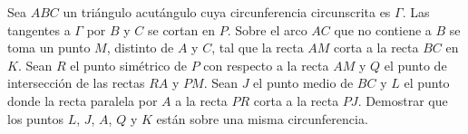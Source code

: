 Sea $ABC$ un triángulo acutángulo cuya circunferencia circunscrita es $\Gamma$. Las tangentes a $\Gamma$ por $B$ y $C$ se cortan en $P$. Sobre el arco $AC$ que no contiene a $B$ se toma un punto $M$, distinto de $A$ y $C$, tal que la recta $AM$ corta a la recta $BC$ en $K$. Sean $R$ el punto simétrico de $P$ con respecto a la recta $AM$ y $Q$ el punto de intersección de las rectas $RA$ y $PM$. Sean $J$ el punto medio de $BC$ y $L$ el punto donde la recta paralela por $A$ a la recta $PR$ corta a la recta $PJ$. Demostrar que los puntos $L$, $J$, $A$, $Q$ y $K$ están sobre una misma circunferencia.

